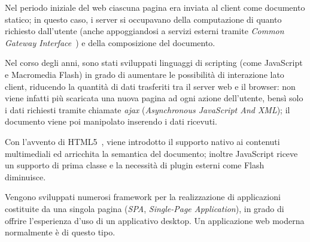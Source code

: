   Nel periodo iniziale del web ciascuna pagina era inviata al client come documento statico;
  in questo caso, i server si occupavano della computazione di quanto richiesto dall'utente (anche appoggiandosi a servizi esterni tramite \emph{Common Gateway Interface}~\cite{Coar2004}) e della composizione del documento.

  Nel corso degli anni, sono stati sviluppati linguaggi di scripting (come JavaScript e Macromedia Flash) in grado di aumentare le possibilità di interazione lato client, riducendo la quantità di dati trasferiti tra il server web e il browser:
  non viene infatti più scaricata una nuova pagina ad ogni azione dell'utente, bensì solo i dati richiesti tramite chiamate \emph{ajax} (\emph{Asynchronous JavaScript And XML});
  il documento viene poi manipolato inserendo i dati ricevuti.

  Con l'avvento di HTML5~\cite{Smith2008}, viene introdotto il supporto nativo ai contenuti multimediali ed arricchita la semantica del documento;
  inoltre JavaScript riceve un supporto di prima classe e la necessità di plugin esterni come Flash diminuisce.

  Vengono sviluppati numerosi framework per la realizzazione di applicazioni costituite da una singola pagina (\emph{SPA}, \emph{Single-Page Application}), in grado di offrire l'esperienza d'uso di un applicativo desktop.
  Un applicazione web moderna normalmente è di questo tipo.





